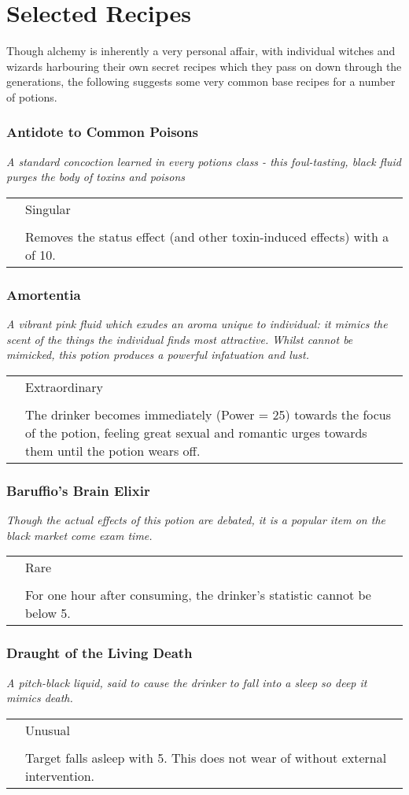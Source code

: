 \section{Selected Recipes}

Though alchemy is inherently a very personal affair, with individual witches and wizards harbouring their own secret recipes which they pass on down through the generations, the following suggests some very common base recipes for a number of potions. 



\newcommand\potion[5]
{
	\subsubsection{#1}
	
	{\it #2}
	
	\begin{tabular}{l p{5cm}}
		\key{Rarity:}	& #3
		\\
		\key{Ingredients:}	& \imp{#4}
		\\
		\key{Effect:}	& #5
	\end{tabular}
}

\potion{Antidote to Common Poisons}{A standard concoction learned in every potions class - this foul-tasting, black fluid purges the body of toxins and poisons}{Singular}{Moondew, Eye of Newt, Bezoar}{Removes the \imp{Poisoned} status effect (and other toxin-induced effects) with a \imp{Power} of 10.}

\potion{Amortentia}{A vibrant pink fluid which exudes an aroma unique to individual: it mimics the scent of the things the individual finds most attractive. Whilst \imp{True Love} cannot be mimicked, this potion produces a powerful infatuation and lust.}{Extraordinary}{Ashwinder Eggs, Unicorn Hair, Pearl Dust, Fire Seed, plus a token of the focus of desire}{The drinker becomes immediately \imp{Charmed} (Power = 25) towards the focus of the potion, feeling great sexual and romantic urges towards them until the potion wears off.} 

\potion{Baruffio's Brain Elixir}{Though the actual effects of this potion are debated, it is a popular item on the \imp{Hogwarts} black market come exam time.}{Rare}{Runespoor Eggs, Dragon Claw, Griffin Claw}{For one hour after consuming, the drinker's \imp{Intelligence} statistic cannot be below 5.}

\potion{Draught of the Living Death}{A pitch-black liquid, said to cause the drinker to fall into a sleep so deep it mimics death.}{Unusual}{Asphodel, Sloth Brain, Venemous Tentacula}{Target falls asleep with \imp{Power} 5. This does not wear of without external intervention.}

